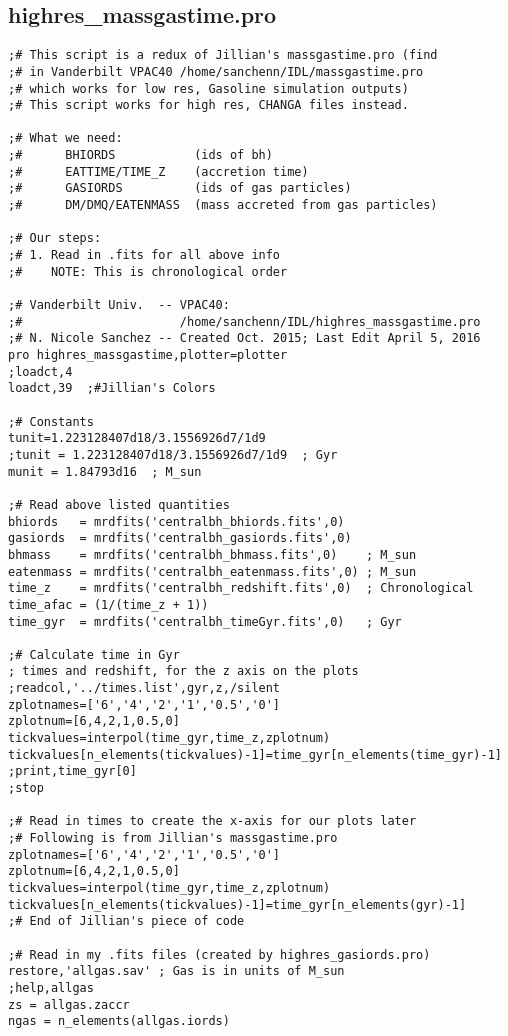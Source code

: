 \documentclass[12pt,headA,chapB]{fiskthesis}
\begin{document}
\newpage
\subsection{highres\_massgastime.pro}
\begin{verbatim}
;# This script is a redux of Jillian's massgastime.pro (find
;# in Vanderbilt VPAC40 /home/sanchenn/IDL/massgastime.pro
;# which works for low res, Gasoline simulation outputs)
;# This script works for high res, CHANGA files instead.

;# What we need:
;#      BHIORDS           (ids of bh)
;#      EATTIME/TIME_Z    (accretion time)
;#      GASIORDS          (ids of gas particles) 
;#      DM/DMQ/EATENMASS  (mass accreted from gas particles)

;# Our steps:
;# 1. Read in .fits for all above info
;#    NOTE: This is chronological order

;# Vanderbilt Univ.  -- VPAC40:
;#                      /home/sanchenn/IDL/highres_massgastime.pro
;# N. Nicole Sanchez -- Created Oct. 2015; Last Edit April 5, 2016
pro highres_massgastime,plotter=plotter
;loadct,4
loadct,39  ;#Jillian's Colors

;# Constants
tunit=1.223128407d18/3.1556926d7/1d9
;tunit = 1.223128407d18/3.1556926d7/1d9  ; Gyr 
munit = 1.84793d16  ; M_sun

;# Read above listed quantities
bhiords   = mrdfits('centralbh_bhiords.fits',0)
gasiords  = mrdfits('centralbh_gasiords.fits',0)  
bhmass    = mrdfits('centralbh_bhmass.fits',0)    ; M_sun
eatenmass = mrdfits('centralbh_eatenmass.fits',0) ; M_sun
time_z    = mrdfits('centralbh_redshift.fits',0)  ; Chronological 
time_afac = (1/(time_z + 1))
time_gyr  = mrdfits('centralbh_timeGyr.fits',0)   ; Gyr

;# Calculate time in Gyr
; times and redshift, for the z axis on the plots
;readcol,'../times.list',gyr,z,/silent
zplotnames=['6','4','2','1','0.5','0']
zplotnum=[6,4,2,1,0.5,0]
tickvalues=interpol(time_gyr,time_z,zplotnum) 
tickvalues[n_elements(tickvalues)-1]=time_gyr[n_elements(time_gyr)-1]
;print,time_gyr[0]
;stop

;# Read in times to create the x-axis for our plots later
;# Following is from Jillian's massgastime.pro
zplotnames=['6','4','2','1','0.5','0']
zplotnum=[6,4,2,1,0.5,0]
tickvalues=interpol(time_gyr,time_z,zplotnum)
tickvalues[n_elements(tickvalues)-1]=time_gyr[n_elements(gyr)-1]
;# End of Jillian's piece of code

;# Read in my .fits files (created by highres_gasiords.pro)
restore,'allgas.sav' ; Gas is in units of M_sun
;help,allgas
zs = allgas.zaccr
ngas = n_elements(allgas.iords)


\end{verbatim}
\end{document}
